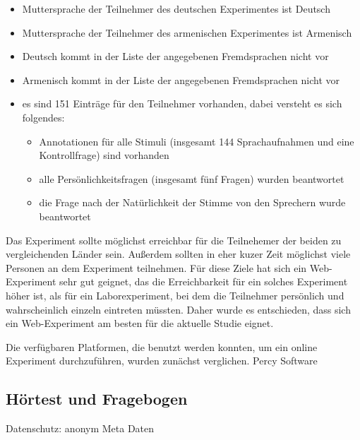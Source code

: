 \documentclass[11pt,a4paper,headsepline,twoside,toc=bibliography]{scrreprt}
\begin{document}
\begin{itemize}
	\item Muttersprache der Teilnehmer des deutschen Experimentes ist Deutsch 
	\item Muttersprache der Teilnehmer des armenischen Experimentes ist Armenisch
	\item Deutsch kommt in der Liste der angegebenen Fremdsprachen nicht vor
	\item Armenisch kommt in der Liste der angegebenen Fremdsprachen nicht vor
	\item es sind 151 Einträge für den Teilnehmer vorhanden, dabei versteht es sich folgendes:
	
	\begin{itemize}	 
		\item Annotationen für alle Stimuli (insgesamt 144 Sprachaufnahmen und eine Kontrollfrage) sind vorhanden
		\item alle Persönlichkeitsfragen (insgesamt fünf Fragen) wurden beantwortet
		\item die Frage nach der Natürlichkeit der Stimme von den Sprechern wurde beantwortet
	\end{itemize}
\end{itemize}



Das Experiment sollte möglichst erreichbar für die Teilnehemer der beiden zu vergleichenden Länder sein. Außerdem sollten in eher kuzer Zeit möglichst viele Personen an dem Experiment teilnehmen. Für diese Ziele hat sich ein Web-Experiment sehr gut geignet, das die Erreichbarkeit für ein solches Experiment höher ist, als für ein Laborexperiment, bei dem die Teilnehmer persönlich und wahrscheinlich einzeln eintreten müssten. Daher wurde es entschieden, dass sich ein Web-Experiment am besten für die aktuelle Studie eignet. 

Die verfügbaren Platformen, die benutzt werden konnten, um ein online Experiment durchzuführen, wurden  zunächst verglichen. Percy Software \parencite{Draxler2011} 


\subsection{Hörtest und Fragebogen}
\label{sec:stimulusobject}


Datenschutz: anonym
Meta Daten
\end{document}
